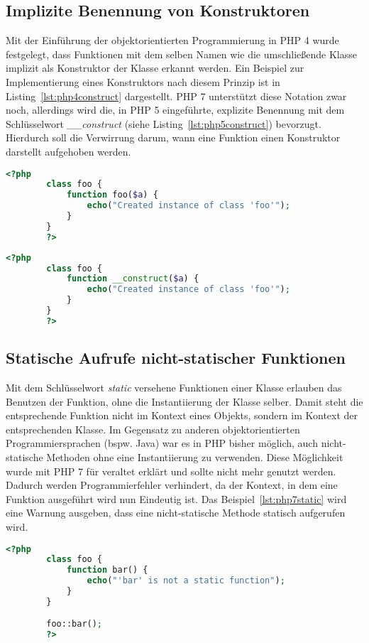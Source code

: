     \subsection{Implizite Benennung von Konstruktoren}\label{php5implicit}
    Mit der Einführung der objektorientierten Programmierung in PHP 4 wurde festgelegt, dass Funktionen mit dem selben Namen wie die umschließende Klasse implizit als 
    Konstruktor der Klasse erkannt werden. Ein Beispiel zur Implementierung eines Konstruktors nach diesem Prinzip ist in Listing~\ref{lst:php4construct} dargestellt.
    PHP 7 unterstützt diese Notation zwar noch, allerdings wird die, in PHP 5 eingeführte, explizite Benennung mit dem Schlüsselwort \textit{\_\_construct} (siehe 
    Listing~\ref{lst:php5construct}) bevorzugt. Hierdurch soll die Verwirrung darum, wann eine Funktion einen Konstruktor darstellt aufgehoben werden. \cite{morrison_php:_2014}
    \begin{lstlisting}[language=php, caption={Beispiel eines impliziten Konstruktors}, label={lst:php4construct}]
        <?php
        class foo {
            function foo($a) {
                echo("Created instance of class 'foo'");
            }
        }
        ?>
    \end{lstlisting}

    \begin{lstlisting}[language=php, caption={Beispiel eines expliziten Konstruktors}, label={lst:php5construct}]
        <?php
        class foo {
            function __construct($a) {
                echo("Created instance of class 'foo'");
            }
        }
        ?>
    \end{lstlisting}
    
    \subsection{Statische Aufrufe nicht-statischer Funktionen}
    Mit dem Schlüsselwort \textit{static} versehene Funktionen einer Klasse erlauben das Benutzen der Funktion, ohne die 
    Instantiierung der Klasse selber. Damit steht die entsprechende Funktion nicht im Kontext eines Objekts, sondern 
    im Kontext der entsprechenden Klasse. Im Gegensatz zu anderen objektorientierten Programmiersprachen (bspw. Java) war es 
    in PHP bisher möglich, auch nicht-statische Methoden ohne eine Instantiierung zu verwenden. Diese Möglichkeit wurde mit
    PHP 7 für veraltet erklärt und sollte nicht mehr genutzt werden. Dadurch werden Programmierfehler verhindert, da der Kontext, in dem eine Funktion ausgeführt wird nun
    Eindeutig ist. Das Beispiel~\ref{lst:php7static} wird eine Warnung ausgeben, dass eine nicht-statische Methode statisch aufgerufen wird.
    \begin{lstlisting}[language=php, caption={Beispiel eines statischen Aufrufs einer nicht-satischen Funktion in PHP 7}, label={lst:php7static}]
        <?php
        class foo {
            function bar() {
                echo("'bar' is not a static function");
            }
        }

        foo::bar();
        ?>
    \end{lstlisting}

